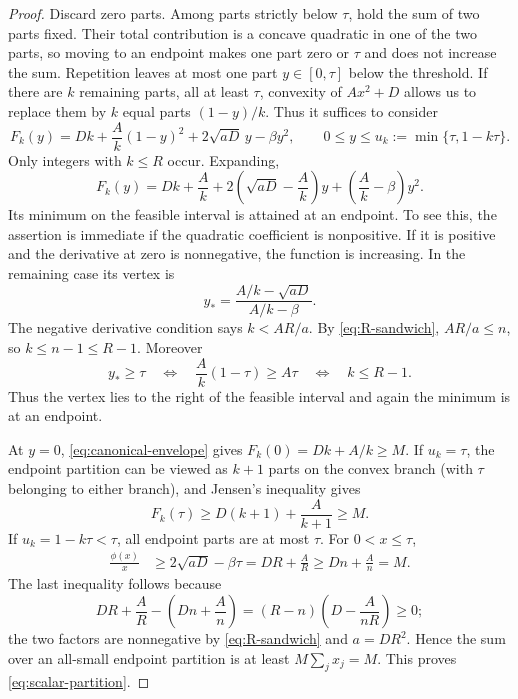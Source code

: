 \documentclass[11pt]{article}
\theoremstyle{remark}
\begin{document}
\begin{proof}
Discard zero parts.  Among parts strictly below $\tau$, hold the sum of
two parts fixed.  Their total contribution is a concave quadratic in one
of the two parts, so moving to an endpoint makes one part zero or
$\tau$ and does not increase the sum.  Repetition leaves at most one
part $y\in[0,\tau]$ below the threshold.  If there are $k$ remaining
parts, all at least $\tau$, convexity of $Ax^2+D$ allows us to replace
them by $k$ equal parts $(1-y)/k$.  Thus it suffices to consider
\begin{equation}\label{eq:Fky}
 F_k(y)=Dk+\frac Ak(1-y)^2+2\sqrt{aD}\,y-\beta y^2,
 \qquad
 0\leq y\leq u_k:=\min\{\tau,1-k\tau\}.
\end{equation}
Only integers with $k\leq R$ occur.  Expanding,
\begin{equation}\label{eq:Fky-expanded}
 F_k(y)=Dk+\frac Ak
 +2\left(\sqrt{aD}-\frac Ak\right)y
 +\left(\frac Ak-\beta\right)y^2.
\end{equation}
Its minimum on the feasible interval is attained at an endpoint.  To
see this, the assertion is immediate if the quadratic coefficient is
nonpositive.  If it is positive and the derivative at zero is
nonnegative, the function is increasing.  In the remaining case its
vertex is
\[
 y_*=\frac{A/k-\sqrt{aD}}{A/k-\beta}.
\]
The negative derivative condition says
$k<AR/a$.  By \eqref{eq:R-sandwich}, $AR/a\leq n$, so
$k\leq n-1\leq R-1$.  Moreover
\[
 y_*\geq\tau
 \quad\Longleftrightarrow\quad
 \frac A k(1-\tau)\geq A\tau
 \quad\Longleftrightarrow\quad k\leq R-1.
\]
Thus the vertex lies to the right of the feasible interval and again the
minimum is at an endpoint.

At $y=0$, \eqref{eq:canonical-envelope} gives
$F_k(0)=Dk+A/k\geq M$.  If $u_k=\tau$, the endpoint partition can be
viewed as $k+1$ parts on the convex branch (with $\tau$ belonging to
either branch), and Jensen's inequality gives
\[
 F_k(\tau)\geq D(k+1)+\frac{A}{k+1}\geq M.
\]
If $u_k=1-k\tau<\tau$, all endpoint parts are at most $\tau$.  For
$0<x\leq\tau$,
\begin{align}
 \frac{\phi(x)}x
 &\geq2\sqrt{aD}-\beta\tau
   =DR+\frac AR
   \geq Dn+\frac An=M. \label{eq:phi-linear-lower}
\end{align}
The last inequality follows because
\[
 DR+\frac AR-\left(Dn+\frac An\right)
 =(R-n)\left(D-\frac{A}{nR}\right)\geq0;
\]
the two factors are nonnegative by \eqref{eq:R-sandwich} and
$a=DR^2$.  Hence the sum over an all-small endpoint partition is at
least $M\sum_jx_j=M$.  This proves
\eqref{eq:scalar-partition}.


\end{proof}
\end{document}

